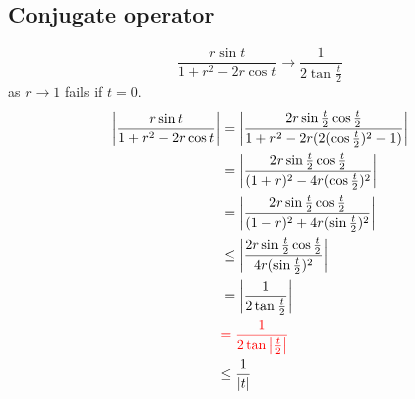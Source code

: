 \subsection{Conjugate operator}
\begin{remark}
    {\color{red}\begin{equation*}
            \frac{r\sin{t}}{1+r^2-2r\cos{t}}\to\frac{1}{2\tan{\frac{t}{2}}}
        \end{equation*}
        as $r\to 1$ fails if $t=0$.}
    \begin{align*}
        \left\lvert\frac{r\sin{t}}{1+r^2-2r\cos{t}}\right\rvert & =\left\lvert\frac{2r\sin{\frac{t}{2}}\cos{\frac{t}{2}}}{1+r^2-2r(2(\cos{\frac{t}{2}})^2-1)}\right\rvert \\
                                               & =\left\lvert\frac{2r\sin{\frac{t}{2}}\cos{\frac{t}{2}}}{(1+r)^2-4r(\cos{\frac{t}{2}})^2}\right\rvert    \\
                                               & =\left\lvert\frac{2r\sin{\frac{t}{2}}\cos{\frac{t}{2}}}{(1-r)^2+4r(\sin{\frac{t}{2}})^2}\right\rvert    \\
                                               & \leq\left\lvert\frac{2r\sin{\frac{t}{2}}\cos{\frac{t}{2}}}{4r(\sin{\frac{t}{2}})^2}\right\rvert         \\
                                               & =\left\lvert\frac{1}{2\tan{\frac{t}{2}}}\right\rvert                                                    \\
                                               & {\color{red}=\frac{1}{2\tan{\left\lvert\frac{t}{2}\right\rvert}}}                                       \\
                                               & {\leq\frac{1}{\left\lvert t\right\rvert}}
    \end{align*}

\end{remark}

